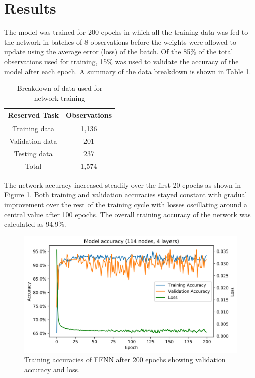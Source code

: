 \documentclass[twoside,twocolumn]{article}
\begin{document}

\section{Results}
The model was trained for 200 epochs in which all the training data was fed to the network in batches of 8 observations before the weights were allowed to update using the average error (loss) of the batch. Of the 85\% of the total observations used for training, 15\% was used to validate the accuracy of the model after each epoch. A summary of the data breakdown is shown in Table \ref{tab:data}.

\begin{table}[]
	\centering
	\caption{Breakdown of data used for network training }
	\label{tab:data}
	\begin{tabular}{@{}cc@{}}
		\toprule
		\textbf{Reserved Task} & \textbf{Observations} \\ \midrule
		Training data & 1,136 \\
		Validation data & 201 \\
		Testing data & 237 \\ 
		Total & 1,574 \\ \bottomrule
	\end{tabular}
\end{table}

The network accuracy increased steadily over the first 20 epochs as shown in Figure \ref{fig:ffnn_training}. Both training and validation accuracies stayed constant with gradual improvement over the rest of the training cycle with losses oscillating around a central value after 100 epochs. The overall training accuracy of the network was calculated as 94.9\%.

\begin{figure}[!ht]
	\centering
	\includegraphics[width=.9\textwidth]{images/training_acc_loss.png}  
	\caption{Training accuracies of FFNN after 200 epochs showing validation accuracy and loss.}
	\label{fig:ffnn_training}
\end{figure}
\end{document}
